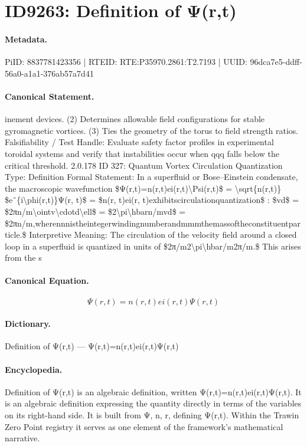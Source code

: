 \section*{ID9263: Definition of Ψ(r,t)}
\paragraph{Metadata.}
PiID: 8837781423356 | RTEID: RTE:P35970.2861:T2.7193 | UUID: 96dca7e5-ddff-56a0-a1a1-376ab57a7d41

\paragraph{Canonical Statement.}
inement devices. (2) Determines allowable field configurations for stable gyromagnetic vortices. (3) Ties the geometry of the torus to field strength ratios. Falsifiability / Test Handle: Evaluate safety factor profiles in experimental toroidal systems and verify that instabilities occur when qqq falls below the critical threshold. 2.0.178 ID 327: Quantum Vortex Circulation Quantization Type: Definition Formal Statement: In a superfluid or Bose–Einstein condensate, the macroscopic wavefunction \$Ψ(r,t)=n(r,t)ei(r,t)\textbackslash{}Psi(r,t)\$ = \textbackslash{}sqrt\{n(r,t)\} \$eˆ\{i\textbackslash{}phi(r,t)\}Ψ(r, t)\$ = \$n(r, t)ei(r, t)exhibitscirculationquantization\$ : \$vd\$ = \$2πn/m\textbackslash{}ointv\textbackslash{}cdotd\textbackslash{}ell\$ = \$2\textbackslash{}pi\textbackslash{}hbarn/mvd\$ = \$2πn/m,wherennnistheintegerwindingnumberandmmmthemassoftheconstituentparticle.\$ Interpretive Meaning: The circulation of the velocity field around a closed loop in a superfluid is quantized in units of \$2π/m2\textbackslash{}pi\textbackslash{}hbar/m2π/m.\$ This arises from the s

\paragraph{Canonical Equation.}
\[
Ψ(r,t)=n(r,t)ei(r,t)\Psi(r,t)
\]

\paragraph{Dictionary.}
Definition of Ψ(r,t) — Ψ(r,t)=n(r,t)ei(r,t)Ψ(r,t)

\paragraph{Encyclopedia.}
Definition of Ψ(r,t) is an algebraic definition, written Ψ(r,t)=n(r,t)ei(r,t)Ψ(r,t). It is an algebraic definition expressing the quantity directly in terms of the variables on its right-hand side. It is built from Ψ, n, r, defining Ψ(r,t). Within the Trawin Zero Point registry it serves as one element of the framework's mathematical narrative.
